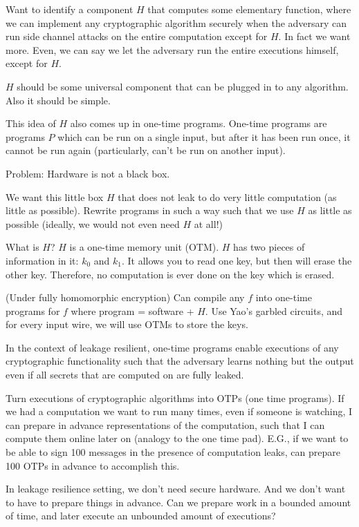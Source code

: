 \documentclass[10pt]{article}
\begin{document}
Want to identify a component $H$ that computes some elementary function, where we can implement any cryptographic algorithm securely when the adversary can run side channel attacks on the entire computation except for $H$. In fact we want more. Even, we can say we let the adversary run the entire executions himself, except for $H$.

$H$ should be some universal component that can be plugged in to any algorithm. Also it should be simple.

This idea of $H$ also comes up in one-time programs. One-time programs are programs $P$ which can be run on a single input, but after it has been run once, it cannot be run again (particularly, can't be run on another input).

Problem: Hardware is not a black box.

We want this little box $H$ that does not leak to do very little computation (as little as possible). Rewrite programs in such a way such that we use $H$ as little as possible (ideally, we would not even need $H$ at all!)

What is $H$? $H$ is a one-time memory unit (OTM). $H$ has two pieces of information in it: $k_0$ and $k_1$. It allows you to read one key, but then will erase the other key. Therefore, no computation is ever done on the key which is erased.

\begin{theorem}
(Under fully homomorphic encryption) Can compile any $f$ into one-time programs for $f$ where program = software + $H$. Use Yao's garbled circuits, and for every input wire, we will use OTMs to store the keys.
\end{theorem}

In the context of leakage resilient, one-time programs enable executions of any cryptographic functionality such that the adversary learns nothing but the output even if all secrets that are computed on are fully leaked.

Turn executions of cryptographic algorithms into OTPs (one time programs). If we had a computation we want to run many times, even if someone is watching, I can prepare in advance representations of the computation, such that I can compute them online later on (analogy to the one time pad). E.G., if we want to be able to sign 100 messages in the presence of computation leaks, can prepare 100 OTPs in advance to accomplish this.

In leakage resilience setting, we don't need secure hardware. And we don't want to have to prepare things in advance. Can we prepare work in a bounded amount of time, and later execute an unbounded amount of executions?
\end{document}
